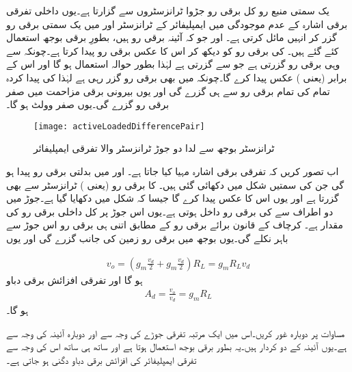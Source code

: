 یک سمتی  منبع رو کل  برقی رو جڑوا ٹرانزسٹروں سے گزارتا ہے۔یوں داخلی تفرقی برقی اشارہ کے عدم موجودگی میں ایمپلیفائر کے ٹرانزسٹر   اور  میں یک سمتی برقی رو  گزر کر انہیں مائل کرتی ہے۔  اور  جو کہ آئینہ برقی رو ہیں، بطورِ برقی بوجھ استعمال کئے گئے ہیں۔  کی برقی رو کو دیکھ کر  اس کا عکس برقی رو پیدا کرتا ہے۔چونکہ  سے وہی برقی رو گزرتی ہے جو  سے گزرتی ہے لہٰذا  بطور حوالہ استعمال ہو گا اور   اس کے برابر (یعنی   ) عکس پیدا کرے گا۔چونکہ   میں بھی  برقی رو گزر رہی ہے لہٰذا  کی پیدا کردہ تمام کی تمام برقی رو  سے ہی گزرے گی اور یوں بیرونی برقی مزاحمت  میں صفر برقی رو گزرے گی۔یوں  صفر وولٹ ہو گا۔
\begin{figure}
\centering
\texttt{[image: activeLoadedDifferencePair]}
\caption{ٹرانزسٹر بوجھ سے لدا دو جوڑ ٹرانزسٹر والا تفرقی ایمپلیفائر}
\label{شکل_ٹرانزسٹر_بار_سے_لدھا_تفرقی_جوڑا}
\end{figure}
اب تصور کریں کہ تفرقی برقی اشارہ  مہیا کیا جاتا ہے۔  اور   میں بدلتی برقی رو  پیدا ہو گی جن کی سمتیں شکل میں دکھائی گئی ہیں۔  کا برقی رو (یعنی  ) ٹرانزسٹر   سے بھی گزرتا ہے اور یوں   اس کا عکس پیدا کرے گا جیسا کہ شکل میں دکھایا گیا ہے۔جوڑ  میں دو اطراف سے   کی برقی رو داخل ہوتی ہے۔یوں اس جوڑ پر کل داخلی برقی رو کی مقدار   ہے۔ کرچاف کے قانون برائے برقی رو کے مطابق اتنی ہی برقی رو اس جوڑ سے باہر نکلے گی۔یوں بوجھ  میں  برقی رو زمین کی جانب گزرے گی اور یوں

\begin{align} \label{مساوات_تفرقی_ٹرانزسٹر_سے_لدھے_تفرقی_جوڑے_کا_مخارج}
v_o=\left(g_m \frac{v_d}{2}+g_m \frac{v_d}{2} \right )R_L=g_m R_L v_d
\end{align}
ہو گا اور تفرقی افزائش برقی دباو
\begin{align} \label{مساوات_تفرقی_ٹرانزسٹر_لدھا_تفرقی_افزائش}
A_d=\frac{v_o}{v_d}=g_m R_L
\end{align}
ہو گا۔

مساوات   پر دوبارہ غور کریں۔اس میں   ایک مرتبہ تفرقی جوڑے کی وجہ سے اور دوبارہ آئینہ کی وجہ سے ہے۔یوں آئینہ کے دو کردار ہیں۔یہ بطور برقی بوجھ استعمال ہوتا ہے اور ساتھ ہی ساتھ اس کی وجہ سے تفرقی ایمپلیفائر کی افزائش برقی دباو  دگنی ہو جاتی ہے۔

